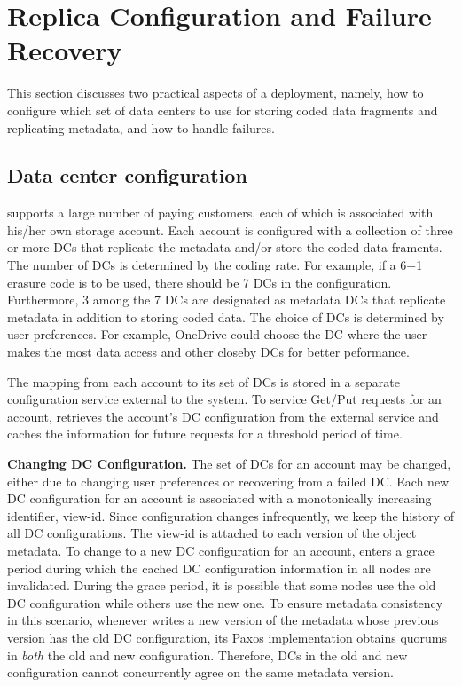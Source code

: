 \section{Replica Configuration and Failure Recovery}

This section discusses two practical aspects of a {\name} deployment, namely,
how to configure which set of data centers to use for storing coded data
fragments and replicating metadata, and how to handle failures.

\subsection{Data center configuration}
\label{subsec:config}

\name supports a large number of paying customers, each of which is associated
with his/her own storage account.  Each \name account is configured with a
collection of three or more DCs that replicate the metadata and/or store the
coded data framents.  The number of DCs is determined by the coding rate. For example, if a 
6+1 erasure code is to be used, there should be 7 DCs in the configuration.  
Furthermore, 3 among the 7 DCs are designated as metadata DCs that replicate 
metadata in addition to storing coded data.
The choice of DCs is determined by user preferences.  For
example, OneDrive could choose the DC where the user makes the most data access and 
other closeby DCs for better peformance.

The mapping from each \name account to its set of DCs is stored in a
separate configuration service external to the \name system.  To service
Get/Put requests for an account, \name retrieves the account's DC configuration
from the external service and caches the information for future requests for a
threshold period of time.

{\bf Changing DC Configuration.} 
The set of DCs for an account may be changed, either due to changing user
preferences or recovering from a failed DC.  Each new DC configuration for an
account is associated with a monotonically increasing identifier, view-id.
Since configuration changes infrequently, we keep the history of all DC configurations.  The view-id is
attached to each version of the object metadata. To change to a new DC
configuration for an account, \name enters a grace period during which the
cached DC configuration information in all {\name} nodes are invalidated.
During the grace period, it is possible that some nodes use the old DC configuration
while others use the new one. To ensure metadata consistency in this scenario,
whenever \name writes a new version of the metadata whose previous version has
the old DC configuration, its Paxos implementation obtains quorums in {\em
both} the old and new configuration.  Therefore, DCs in the old and new
configuration cannot concurrently agree on the same metadata version.

